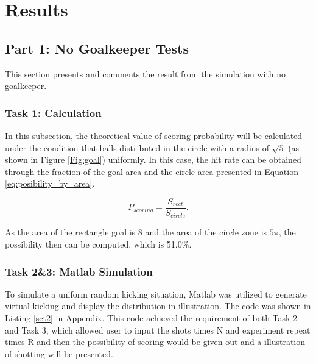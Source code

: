 \documentclass[11pt, a4paper]{article}
\begin{document}
%


\section{Results}

\subsection{Part 1: No Goalkeeper Tests}

This section presents and comments the result from the simulation with no goalkeeper.

\subsubsection{Task 1: Calculation}

In this subsection, the theoretical value of scoring probability will be calculated under the condition that balls distributed in the circle with a radius of $\sqrt{5}$ (as shown in Figure \ref{Fig:goal}) uniformly. In this case, the hit rate can be obtained through the fraction of the goal area and the circle area presented in Equation \ref{eq:posibility_by_area}.

\begin{equation}
P_{scoring} = \frac{S_{rect}}{S_{circle}}.
\label{eq:posibility_by_area}
\end{equation}

As the area of the rectangle goal is $8$ and the area of the circle zone is $5\pi$, the possibility then can be computed, which is 51.0\%.


\subsubsection{Task 2\&3: Matlab Simulation}

To simulate a uniform random kicking situation, Matlab was utilized to generate virtual kicking and display the distribution in illustration. The code was shown in Listing \ref{sct2} in Appendix. This code achieved the requirement of both Task 2 and Task 3, which allowed user to input the shots times N and experiment repeat times R and then the possibility of scoring would be given out and a illustration of shotting will be presented.
\end{document}
